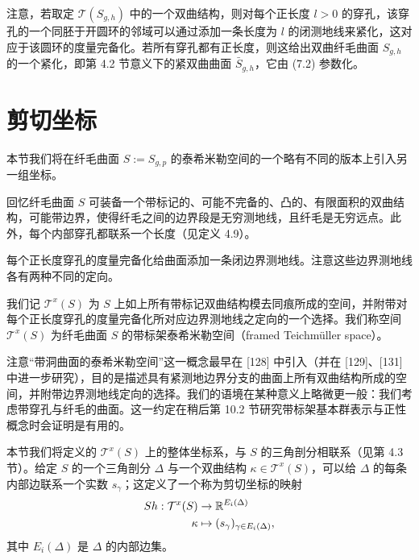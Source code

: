 
注意，若取定 $\mathcal{T}(S_{g,h})$ 中的一个双曲结构，则对每个正长度 $l>0$ 的穿孔，该穿孔的一个同胚于开圆环的邻域可以通过添加一条长度为 $l$ 的闭测地线来紧化，这对应于该圆环的度量完备化。若所有穿孔都有正长度，则这给出双曲纤毛曲面 $S_{g,h}$ 的一个紧化，即第 4.2 节意义下的紧双曲曲面 $\bar S_{g,h}$，它由 (7.2) 参数化。


\section{剪切坐标}

本节我们将在纤毛曲面 $S:=S_{g,p}$ 的泰希米勒空间的一个略有不同的版本上引入另一组坐标。

回忆纤毛曲面 $S$ 可装备一个带标记的、可能不完备的、凸的、有限面积的双曲结构，可能带边界，使得纤毛之间的边界段是无穷测地线，且纤毛是无穷远点。此外，每个内部穿孔都联系一个长度（见定义 4.9）。

每个正长度穿孔的度量完备化给曲面添加一条闭边界测地线。注意这些边界测地线各有两种不同的定向。

\begin{definition}[7.3] 我们记 $\mathcal{T}^x(S)$ 为 $S$ 上如上所有带标记双曲结构模去同痕所成的空间，并附带对每个正长度穿孔的度量完备化所对应边界测地线之定向的一个选择。我们称空间 $\mathcal{T}^x(S)$ 为纤毛曲面 $S$ 的带标架泰希米勒空间（framed Teichmüller space）。\end{definition}

\begin{remark}[7.4] 注意“带洞曲面的泰希米勒空间”这一概念最早在 [128] 中引入（并在 [129]、[131] 中进一步研究），目的是描述具有紧测地边界分支的曲面上所有双曲结构所成的空间，并附带边界测地线定向的选择。我们的语境在某种意义上略微更一般：我们考虑带穿孔与纤毛的曲面。这一约定在稍后第 10.2 节研究带标架基本群表示与正性概念时会证明是有用的。\end{remark}

本节我们将定义的 $\mathcal{T}^x(S)$ 上的整体坐标系，与 $S$ 的三角剖分相联系（见第 4.3 节）。给定 $S$ 的一个三角剖分 $\Delta$ 与一个双曲结构 $\kappa\in\mathcal{T}^x(S)$，可以给 $\Delta$ 的每条内部边联系一个实数 $s_\gamma$；这定义了一个称为剪切坐标的映射
\[
\begin{aligned}
Sh:\mathcal{T}^x(S)&\to\mathbb{R}^{E_i(\Delta)}\\
\kappa&\mapsto (s_\gamma)_{\gamma\in E_i(\Delta)},
\end{aligned}
\]
其中 $E_i(\Delta)$ 是 $\Delta$ 的内部边集。

